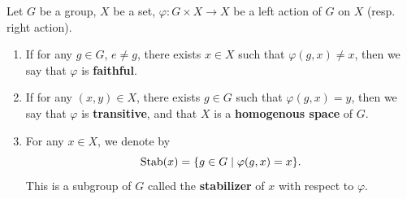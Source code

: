\begin{definitionenv}
    Let $G$ be a group, $X$ be a set, $\varphi: G \times X \rightarrow X$ be a left action of $G$ on $X$ (resp. right action).
    \begin{enumerate}
        \item If for any $g \in G$, $e \neq g$, there exists $x \in X$ such that $\varphi(g,x) \neq x$,
            then we say that $\varphi$ is \textbf{faithful}.
        \item If for any $(x,y) \in X$, there exists $g \in G$ such that $\varphi(g,x) = y$,
            then we say that $\varphi$ is \textbf{transitive},
            and that $X$ is a \textbf{homogenous space} of $G$.
        \item For any $x \in X$, we denote by
            $$ \operatorname{\mathrm{Stab}} (x) = \{g \in G \mid \varphi(g,x) = x\}.$$
            This is a subgroup of $G$ called the \textbf{stabilizer} of $x$ with respect to $\varphi$.
    \end{enumerate}
\end{definitionenv}

